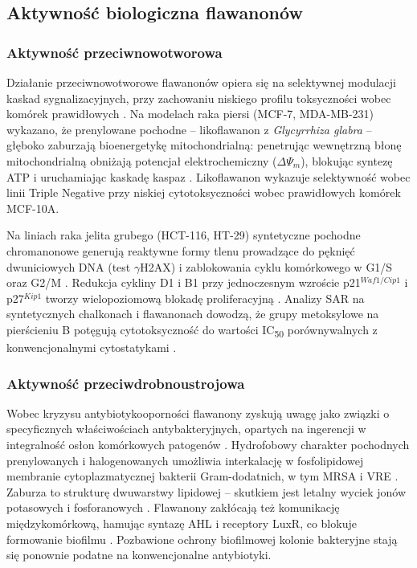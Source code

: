 \documentclass[12pt,a4paper]{article}
\begin{document}
\subsection{Aktywność biologiczna flawanonów}

\subsubsection{Aktywność przeciwnowotworowa}

Działanie przeciwnowotworowe flawanonów opiera się na selektywnej modulacji kaskad sygnalizacyjnych, przy zachowaniu niskiego profilu toksyczności wobec komórek prawidłowych \cite{kopustinskiene2020}. Na modelach raka piersi (MCF-7, MDA-MB-231) wykazano, że prenylowane pochodne -- likoflawanon z \textit{Glycyrrhiza glabra} -- głęboko zaburzają bioenergetykę mitochondrialną: penetrując wewnętrzną błonę mitochondrialną obniżają potencjał elektrochemiczny (\(\Delta\Psi_m\)), blokując syntezę ATP i uruchamiając kaskadę kaspaz \cite{frattaruolo2024}. Likoflawanon wykazuje selektywność wobec linii Triple Negative przy niskiej cytotoksyczności wobec prawidłowych komórek MCF-10A.

Na liniach raka jelita grubego (HCT-116, HT-29) syntetyczne pochodne chromanonowe generują reaktywne formy tlenu prowadzące do pęknięć dwuniciowych DNA (test $\gamma$H2AX) i zablokowania cyklu komórkowego w G1/S oraz G2/M \cite{hikisz2024}. Redukcja cykliny D1 i B1 przy jednoczesnym wzroście p21\(^{Waf1/Cip1}\) i p27\(^{Kip1}\) tworzy wielopoziomową blokadę proliferacyjną \cite{hikisz2024}. Analizy SAR na syntetycznych chalkonach i flawanonach dowodzą, że grupy metoksylowe na pierścieniu B potęgują cytotoksyczność do wartości IC\textsubscript{50} porównywalnych z konwencjonalnymi cytostatykami \cite{cabrera2007}.

\subsubsection{Aktywność przeciwdrobnoustrojowa}

Wobec kryzysu antybiotykooporności flawanony zyskują uwagę jako związki o specyficznych właściwościach antybakteryjnych, opartych na ingerencji w integralność osłon komórkowych patogenów \cite{kopustinskiene2020}. Hydrofobowy charakter pochodnych prenylowanych i halogenowanych umożliwia interkalację w fosfolipidowej membranie cytoplazmatycznej bakterii Gram-dodatnich, w tym MRSA i VRE \cite{santos2020}. Zaburza to strukturę dwuwarstwy lipidowej -- skutkiem jest letalny wyciek jonów potasowych i fosforanowych \cite{santos2020}. Flawanony zakłócają też komunikację międzykomórkową, hamując syntazę AHL i receptory LuxR, co blokuje formowanie biofilmu \cite{kopustinskiene2020}. Pozbawione ochrony biofilmowej kolonie bakteryjne stają się ponownie podatne na konwencjonalne antybiotyki.
\end{document}

